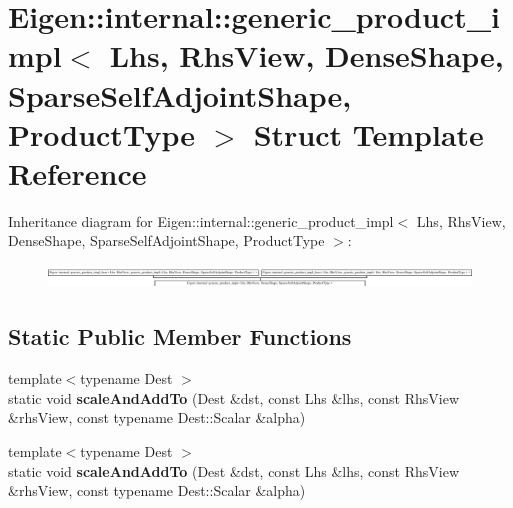 \hypertarget{struct_eigen_1_1internal_1_1generic__product__impl_3_01_lhs_00_01_rhs_view_00_01_dense_shape_00_97d81d328d4cc9ddd79aee8e69e68494}{}\section{Eigen\+:\+:internal\+:\+:generic\+\_\+product\+\_\+impl$<$ Lhs, Rhs\+View, Dense\+Shape, Sparse\+Self\+Adjoint\+Shape, Product\+Type $>$ Struct Template Reference}
\label{struct_eigen_1_1internal_1_1generic__product__impl_3_01_lhs_00_01_rhs_view_00_01_dense_shape_00_97d81d328d4cc9ddd79aee8e69e68494}
Inheritance diagram for Eigen\+:\+:internal\+:\+:generic\+\_\+product\+\_\+impl$<$ Lhs, Rhs\+View, Dense\+Shape, Sparse\+Self\+Adjoint\+Shape, Product\+Type $>$\+:\begin{figure}[H]
\begin{center}
\leavevmode
\includegraphics[height=0.618785cm]{struct_eigen_1_1internal_1_1generic__product__impl_3_01_lhs_00_01_rhs_view_00_01_dense_shape_00_97d81d328d4cc9ddd79aee8e69e68494}
\end{center}
\end{figure}
\subsection*{Static Public Member Functions}
\begin{DoxyCompactItemize}
\item 
\mbox{\label{struct_eigen_1_1internal_1_1generic__product__impl_3_01_lhs_00_01_rhs_view_00_01_dense_shape_00_97d81d328d4cc9ddd79aee8e69e68494_a3955b2546570ffacbdc952e59abb10ec}} 
{\footnotesize template$<$typename Dest $>$ }\\static void {\bfseries scale\+And\+Add\+To} (Dest \&dst, const Lhs \&lhs, const Rhs\+View \&rhs\+View, const typename Dest\+::\+Scalar \&alpha)
\item 
\mbox{\label{struct_eigen_1_1internal_1_1generic__product__impl_3_01_lhs_00_01_rhs_view_00_01_dense_shape_00_97d81d328d4cc9ddd79aee8e69e68494_a3955b2546570ffacbdc952e59abb10ec}} 
{\footnotesize template$<$typename Dest $>$ }\\static void {\bfseries scale\+And\+Add\+To} (Dest \&dst, const Lhs \&lhs, const Rhs\+View \&rhs\+View, const typename Dest\+::\+Scalar \&alpha)
\end{DoxyCompactItemize}
